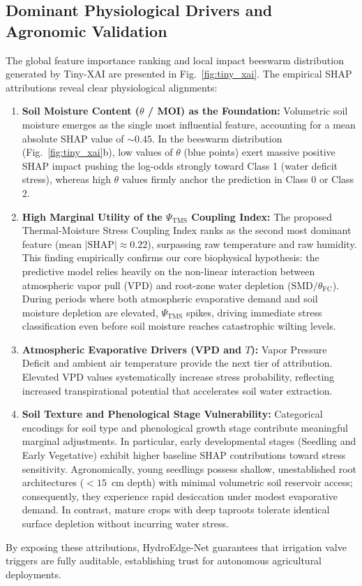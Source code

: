 \subsection{Dominant Physiological Drivers and Agronomic Validation}

The global feature importance ranking and local impact beeswarm distribution generated by Tiny-XAI are presented in Fig.~\ref{fig:tiny_xai}. The empirical SHAP attributions reveal clear physiological alignments:
\begin{enumerate}
    \item \textbf{Soil Moisture Content ($\theta$ / MOI) as the Foundation:} Volumetric soil moisture emerges as the single most influential feature, accounting for a mean absolute SHAP value of $\sim 0.45$. In the beeswarm distribution (Fig.~\ref{fig:tiny_xai}b), low values of $\theta$ (blue points) exert massive positive SHAP impact pushing the log-odds strongly toward Class 1 (water deficit stress), whereas high $\theta$ values firmly anchor the prediction in Class 0 or Class 2.
    \item \textbf{High Marginal Utility of the $\Psi_{\text{TMS}}$ Coupling Index:} The proposed Thermal-Moisture Stress Coupling Index ranks as the second most dominant feature ($\text{mean } |\text{SHAP}| \approx 0.22$), surpassing raw temperature and raw humidity. This finding empirically confirms our core biophysical hypothesis: the predictive model relies heavily on the non-linear interaction between atmospheric vapor pull ($\text{VPD}$) and root-zone water depletion ($\text{SMD}/\theta_{\text{FC}}$). During periods where both atmospheric evaporative demand and soil moisture depletion are elevated, $\Psi_{\text{TMS}}$ spikes, driving immediate stress classification even before soil moisture reaches catastrophic wilting levels.
    \item \textbf{Atmospheric Evaporative Drivers (VPD and $T$):} Vapor Pressure Deficit and ambient air temperature provide the next tier of attribution. Elevated VPD values systematically increase stress probability, reflecting increased transpirational potential that accelerates soil water extraction.
    \item \textbf{Soil Texture and Phenological Stage Vulnerability:} Categorical encodings for soil type and phenological growth stage contribute meaningful marginal adjustments. In particular, early developmental stages (Seedling and Early Vegetative) exhibit higher baseline SHAP contributions toward stress sensitivity. Agronomically, young seedlings possess shallow, unestablished root architectures ($<15$~cm depth) with minimal volumetric soil reservoir access; consequently, they experience rapid desiccation under modest evaporative demand. In contrast, mature crops with deep taproots tolerate identical surface depletion without incurring water stress.
\end{enumerate}

By exposing these attributions, HydroEdge-Net guarantees that irrigation valve triggers are fully auditable, establishing trust for autonomous agricultural deployments.
